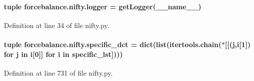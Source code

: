 \hypertarget{namespaceforcebalance_1_1nifty_a1859e992ed983dbbcc8093fdd19710e7}{
\paragraph[{logger}]{\setlength{\rightskip}{0pt plus 5cm}tuple forcebalance.\-nifty.\-logger = get\-Logger(\-\_\-\-\_\-name\-\_\-\-\_\-)}}\label{namespaceforcebalance_1_1nifty_a1859e992ed983dbbcc8093fdd19710e7}


Definition at line 34 of file nifty.\-py.

\hypertarget{namespaceforcebalance_1_1nifty_ab652c941890b0f378100433699c8d255}{
\paragraph[{specific\-\_\-dct}]{\setlength{\rightskip}{0pt plus 5cm}tuple forcebalance.\-nifty.\-specific\-\_\-dct = dict(list(itertools.\-chain($\ast$\mbox{[}\mbox{[}(j,i\mbox{[}1\mbox{]}) for j in i\mbox{[}0\mbox{]}\mbox{]} for i in {\bf specific\-\_\-lst}\mbox{]})))}}\label{namespaceforcebalance_1_1nifty_ab652c941890b0f378100433699c8d255}


Definition at line 731 of file nifty.\-py.

